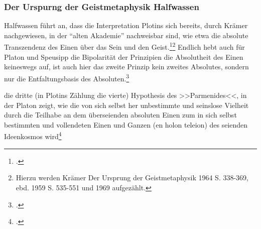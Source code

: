 \subsubsection*{Der Urspurng der Geistmetaphysik Halfwassen}
Halfwassen führt an, dass die Interpretation Plotins sich bereits, durch Krämer nachgewiesen, in der \enquote{alten Akademie} nachweisbar sind, wie etwa die absolute Transzendenz des Einen über das Sein und den Geist.\footcite[vgl.][S. 52]
{HalfwassenGeistmetaphysik}\footnote{Hierzu werden Krämer Der Ursprung der Geistmetaphysik 1964 S. 338-369, ebd. 1959 S. 535-551 und 1969 aufgezählt.} Endlich hebt auch für Platon und Speusipp die Bipolarität der Prinzipien die Absolutheit des Einen keineswegs auf, ist auch hier das zweite Prinzip kein zweites Absolutes, sondern nur die Entfaltungsbasis des Absoluten.\footcite[][S. 53]{HalfwassenGeistmetaphysik}


die dritte (in Plotins Zählung die vierte) Hypothesis des >>Parmenides<<, in der Platon zeigt, wie die von sich selbst her unbestimmte und seinslose Vielheit durch die Teilhabe an dem überseienden absoluten Einen zum in sich selbst bestimmten und vollendeten Einen und Ganzen (en holon teleion) des seienden Ideenkosmos wird\footcite[vgl.][S. 54f.]{HalfwassenGeistmetaphysik}


